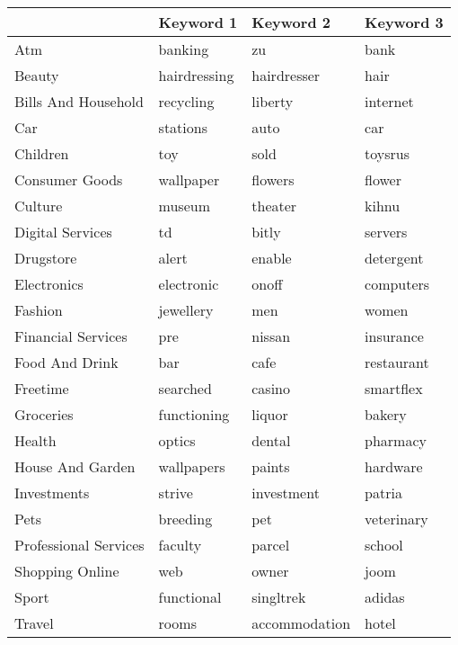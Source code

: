 \begin{tabular}{llll}
\toprule
{} &     Keyword 1 &      Keyword 2 &   Keyword 3 \\
\midrule
Atm                   &       banking &             zu &        bank \\
Beauty                &  hairdressing &    hairdresser &        hair \\
Bills And Household   &     recycling &        liberty &    internet \\
Car                   &      stations &           auto &         car \\
Children              &           toy &           sold &     toysrus \\
Consumer Goods        &     wallpaper &        flowers &      flower \\
Culture               &        museum &        theater &       kihnu \\
Digital Services      &            td &          bitly &     servers \\
Drugstore             &         alert &         enable &   detergent \\
Electronics           &    electronic &          onoff &   computers \\
Fashion               &     jewellery &            men &       women \\
Financial Services    &           pre &         nissan &   insurance \\
Food And Drink        &           bar &           cafe &  restaurant \\
Freetime              &      searched &         casino &   smartflex \\
Groceries             &   functioning &         liquor &      bakery \\
Health                &        optics &         dental &    pharmacy \\
House And Garden      &    wallpapers &         paints &    hardware \\
Investments           &        strive &     investment &      patria \\
Pets                  &      breeding &            pet &  veterinary \\
Professional Services &       faculty &         parcel &      school \\
Shopping Online       &           web &          owner &        joom \\
Sport                 &    functional &      singltrek &      adidas \\
Travel                &         rooms &  accommodation &       hotel \\
\bottomrule
\end{tabular}
